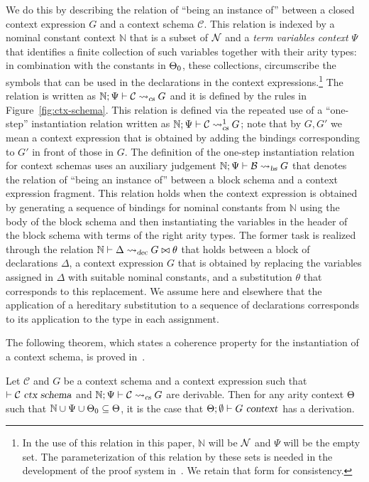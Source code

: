 We do this by describing the relation of ``being an instance of''
between a closed context expression $G$ and a context schema $\mathcal{C}$.
%
This relation is indexed by a nominal constant context $\mathbb{N}$
that is a subset of $\mathcal{N}$ and a \emph{term variables context} $\Psi$
that identifies a finite collection of such variables together with their
arity types: in combination with  the constants in $\Theta_0$,
these collections, circumscribe the symbols that can be used in the
declarations in the context expressions.\footnote{In 
  the use of this relation in this paper, $\mathbb{N}$ will
  be $\mathcal{N}$ and $\Psi$ will be the empty set. The parameterization of
  this relation by these sets is needed in the development of the proof system
  in~\cite{nadathur21arxiv}. We retain that form for consistency.} 
The relation is written as $\mathbb{N} ; \Psi \vdash \mathcal{C} \leadsto_{\mbox{\sl \scriptsize cs}} G$
and it is defined by the rules in Figure~\ref{fig:ctx-schema}.
%
This relation is defined via the repeated use of a ``one-step''
instantiation relation written as
$\mathbb{N} ; \Psi \vdash \mathcal{C} \leadsto^1_{\mbox{\sl \scriptsize cs}} G$; note that by $G, G'$
we mean a context expression that is obtained by adding the bindings
corresponding to $G'$ in front of those in $G$.
%
The definition of the one-step instantiation relation for context
schemas uses an auxiliary judgement
$\mathbb{N} ; \Psi \vdash \mathcal{B} \leadsto_{\mbox{\sl \scriptsize bs}} G$ that denotes the relation
of ``being an instance of'' between a block 
schema and a context expression fragment.
%
This relation holds when the context expression is obtained by
generating a sequence of bindings for nominal constants from
$\mathbb{N}$ using the body of the block schema and then instantiating
the variables in the header of the block schema with terms of the
right arity types.
%
The former task is realized through the relation
$\mathbb{N} \vdash \Delta \leadsto_{\mbox{\sl \scriptsize dec}} G \bowtie \theta$ that holds between a block of
declarations $\Delta$, a context expression $G$ that is obtained
by replacing the variables assigned in $\Delta$ with
suitable nominal constants, and a substitution $\theta$ that
corresponds to this replacement.
%
We assume here and elsewhere that the application of a hereditary
substitution to a sequence of declarations  corresponds to its
application to the type in each assignment. 

The following theorem, which states a coherence property for the
instantiation of a context schema, is proved
in~\cite{nadathur21arxiv}.

\begin{theorem}\label{th:schemainst}
Let $\mathcal{C}$ and $G$ be a context schema and a context expression
such that $\vdash \mathcal{C}\ \mbox{\sl ctx schema}$ and
$\mathbb{N} ; \Psi \vdash \mathcal{C} \leadsto_{\mbox{\sl \scriptsize cs}} G$ are derivable. Then for
any arity context $\Theta$ such that
$\mathbb{N} \cup \Psi \cup \Theta_0 \subseteq \Theta$, it is the case that 
$\Theta;\emptyset \vdash G\ \mbox{\sl context}$ has a derivation. 
\end{theorem}

